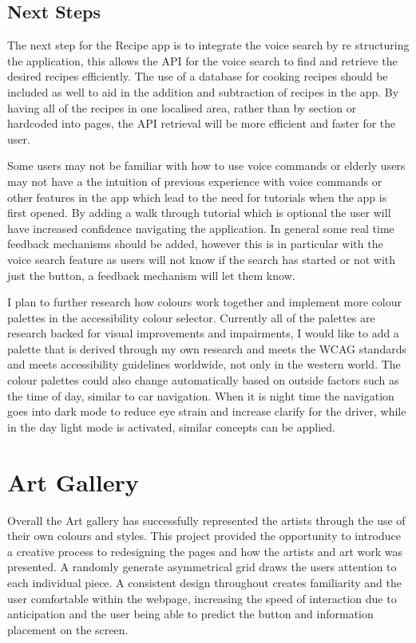 \documentclass[]{project_final}
\begin{document}
\subsection{Next Steps}

The next step for the Recipe app is to integrate the voice search by re structuring the application, this allows the API for the voice search to find and retrieve the desired recipes efficiently. The use of a database for cooking recipes should be included as well to aid in the addition and subtraction of recipes in the app. By having all of the recipes in one localised area, rather than by section or hardcoded into pages, the API retrieval will be more efficient and faster for the user.

Some users may not be familiar with how to use voice commands or elderly users may not have a the intuition of previous experience with voice commands or other features in the app which lead to the need for tutorials when the app is first opened. By adding a walk through tutorial which is optional the user will have increased confidence navigating the application.
In general some real time feedback mechanisms should be added, however this is in particular with the voice search feature as users will not know if the search has started or not with just the button, a feedback mechanism will let them know.

I plan to further research how colours work together and implement more colour palettes in the accessibility colour selector. Currently all of the palettes are research backed for visual improvements and impairments, I would like to add a palette that is derived through my own research and meets the WCAG standards and meets accessibility guidelines worldwide, not only in the western world.
The colour palettes could also change automatically based on outside factors such as the time of day, similar to car navigation. When it is night time the navigation goes into dark mode to reduce eye strain and increase clarify for the driver, while in the day light mode is activated, similar concepts can be applied.


\section{Art Gallery}
Overall the Art gallery has successfully represented the artists through the use of their own colours and styles. This project provided the opportunity to introduce a creative process to redesigning the pages and how the artists and art work was presented. A randomly generate asymmetrical grid draws the users attention to each individual piece.
A consistent design throughout creates familiarity and the user comfortable within the webpage, increasing the speed of interaction due to anticipation and the user being able to predict the button and information placement on the screen.
\end{document}
